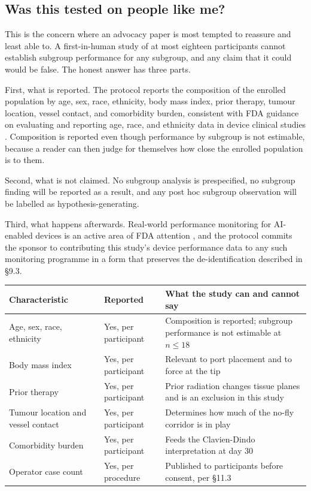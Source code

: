 \vspace{0.30em}

\subsection{Was this tested on people like me?}

This is the concern where an advocacy paper is most tempted to reassure and
least able to. A first-in-human study of at most eighteen participants cannot
establish subgroup performance for any subgroup, and any claim that it could
would be false. The honest answer has three parts.

First, what is reported. The protocol reports the composition of the enrolled
population by age, sex, race, ethnicity, body mass index, prior therapy, tumour
location, vessel contact, and comorbidity burden, consistent with FDA guidance
on evaluating and reporting age, race, and ethnicity data in device clinical
studies \cite{FDADiver2017}. Composition is reported even though performance by
subgroup is not estimable, because a reader can then judge for themselves how
close the enrolled population is to them.

Second, what is not claimed. No subgroup analysis is prespecified, no subgroup
finding will be reported as a result, and any post hoc subgroup observation will
be labelled as hypothesis-generating.

Third, what happens afterwards. Real-world performance monitoring for
AI-enabled devices is an active area of FDA attention \cite{FDARealW2025}, and
the protocol commits the sponsor to contributing this study's device performance
data to any such monitoring programme in a form that preserves the
de-identification described in \S 9.3.

\vspace{0.30em}

\noindent\begin{tabularx}{\textwidth}{L{4.7cm} L{3.4cm} Y}
\toprule
\textbf{Characteristic} & \textbf{Reported} & \textbf{What the study can and cannot say} \\
\midrule
Age, sex, race, ethnicity & Yes, per participant & Composition is reported; subgroup performance is not estimable at $n \leq 18$ \\
Body mass index & Yes, per participant & Relevant to port placement and to force at the tip \\
Prior therapy & Yes, per participant & Prior radiation changes tissue planes and is an exclusion in this study \\
Tumour location and vessel contact & Yes, per participant & Determines how much of the no-fly corridor is in play \\
Comorbidity burden & Yes, per participant & Feeds the Clavien-Dindo interpretation at day 30 \\
Operator case count & Yes, per procedure & Published to participants before consent, per \S 11.3 \\
\bottomrule
\end{tabularx}

